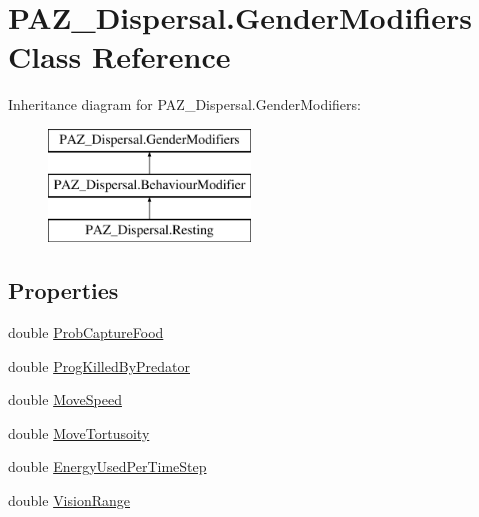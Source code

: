 \hypertarget{class_p_a_z___dispersal_1_1_gender_modifiers}{\section{P\-A\-Z\-\_\-\-Dispersal.\-Gender\-Modifiers Class Reference}
\label{class_p_a_z___dispersal_1_1_gender_modifiers}
}
Inheritance diagram for P\-A\-Z\-\_\-\-Dispersal.\-Gender\-Modifiers\-:\begin{figure}[H]
\begin{center}
\leavevmode
\includegraphics[height=3.000000cm]{class_p_a_z___dispersal_1_1_gender_modifiers}
\end{center}
\end{figure}
\subsection*{Properties}
\begin{DoxyCompactItemize}
\item 
double \hyperlink{class_p_a_z___dispersal_1_1_gender_modifiers_a01b645bf59e17a7723dedabcc407e567}{Prob\-Capture\-Food}
\item 
double \hyperlink{class_p_a_z___dispersal_1_1_gender_modifiers_ac8edbfca2f5227a54673aa6f542e9084}{Prog\-Killed\-By\-Predator}
\item 
double \hyperlink{class_p_a_z___dispersal_1_1_gender_modifiers_aca3f6d959025b94f61e83a6bf869af92}{Move\-Speed}
\item 
double \hyperlink{class_p_a_z___dispersal_1_1_gender_modifiers_a5ee24363150c8e4de8000399ce6c3b65}{Move\-Tortusoity}
\item 
double \hyperlink{class_p_a_z___dispersal_1_1_gender_modifiers_a462f8b3515b5f7da72c8ae30dbde8415}{Energy\-Used\-Per\-Time\-Step}
\item 
double \hyperlink{class_p_a_z___dispersal_1_1_gender_modifiers_ae22c63c1718e9b8d35a06aab2b6f1697}{Vision\-Range}
\end{DoxyCompactItemize}


